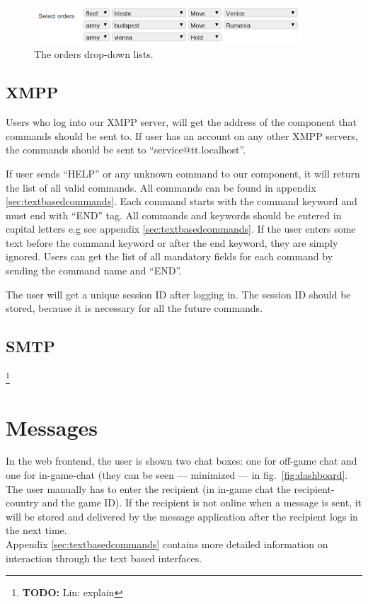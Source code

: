 \documentclass[11pt,a4paper]{report}
\newcommand{\todo}[1]{\footnote{{\color{red} {\bf TODO:} #1}}}
\begin{document}
\begin{figure}[h]
 \centering
 \includegraphics[width=10cm]{./graphics/orderssmall.png}
 \caption{The orders drop-down lists.}
 \label{fig:orders}
\end{figure}

\subsection{XMPP}
Users who log into our XMPP server, will get the address of the component that 
commands should be sent to. If user has an account on any other XMPP servers, 
the commands should be sent to ``service@tt.localhost''. 

If user sends  ``HELP'' or any unknown command to our component, it will return the
 list of all valid commands. All commands can be found in appendix \ref{sec:textbasedcommands}. 
Each command starts with the command keyword and must end with ``END'' tag. 
All commands and keywords should be entered in capital letters e.g 
see appendix \ref{sec:textbasedcommands}. If the user enters some text before the command keyword 
or after the end keyword, they are simply ignored. Users can get the list of 
all mandatory fields for each command by sending the command name and ``END''. 

The user will get a unique session ID after logging in. The session ID should be 
stored, because it is necessary for all the future commands.

\subsection{SMTP}
\todo{Lin: explain}
\section{Messages}
In the web frontend, the user is shown two chat boxes: one for off-game chat
and one for in-game-chat (they can be seen --- minimized --- in
fig.~\ref{fig:dashboard}. The user manually has to enter the recipient (in
in-game chat the recipient-country and the game ID). If the recipient is not
online when a message is sent, it will be stored and delivered by the message
application after the recipient logs in the next time. \\
Appendix \ref{sec:textbasedcommands} contains more detailed information on interaction through the text
based interfaces.
\end{document}
